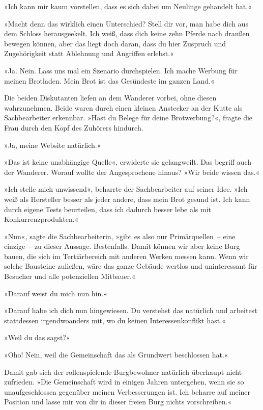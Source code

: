 »Ich kann mir kaum vorstellen, dass es sich dabei um Neulinge gehandelt hat.«

»Macht denn das wirklich einen Unterschied? Stell dir vor, man habe dich aus dem Schloss herausgeekelt. Ich weiß, dass dich keine zehn Pferde nach draußen bewegen können, aber das liegt doch daran, dass du hier Zuspruch und Zugehörigkeit statt Ablehnung und Angriffen erlebst.«

»Ja. Nein. Lass uns mal ein Szenario durchspielen. Ich mache Werbung für meinen Brotladen. Mein Brot ist das Gesündeste im ganzen Land.«

Die beiden Diskutanten liefen an dem Wanderer vorbei, ohne diesen wahrzunehmen. Beide waren durch einen kleinen Anstecker an der Kutte als Sachbearbeiter erkennbar. »Hast du Belege für deine Brotwerbung?«, fragte die Frau durch den Kopf des Zuhörers hindurch.

»Ja, meine Website natürlich.«

»Das ist keine unabhängige Quelle«, erwiderte sie gelangweilt. Das begriff auch der Wanderer. Worauf wollte der Angesprochene hinaus? »Wir beide wissen das.«

»Ich stelle mich unwissend«, beharrte der Sachbearbeiter auf seiner Idee. »Ich weiß als Hersteller besser als jeder andere, dass mein Brot gesund ist. Ich kann durch eigene Tests beurteilen, dass ich dadurch besser lebe als mit Konkurrenzprodukten.«

»Nun«, sagte die Sachbearbeiterin, »gibt es also nur Primärquellen~– eine einzige~– zu dieser Aussage. Bestenfalls. Damit können wir aber keine Burg bauen, die sich im Tertiärbereich mit anderen Werken messen kann. Wenn wir solche Bausteine zuließen, wäre das ganze Gebäude wertlos und uninteressant für Besucher und alle potenziellen Mitbauer.«

»Darauf weist du mich nun hin.«

»Darauf habe ich dich nun hingewiesen. Du verstehst das natürlich und arbeitest stattdessen irgendwoanders mit, wo du keinen Interessenkonflikt hast.«

»Weil du das sagst?«

»Oho! Nein, weil die Gemeinschaft das als Grundwert beschlossen hat.«

Damit gab sich der rollenspielende Burgbewohner natürlich überhaupt nicht zufrieden. »Die Gemeinschaft wird in einigen Jahren untergehen, wenn sie so unaufgeschlossen gegenüber meinen Verbesserungen ist. Ich beharre auf meiner Position und lasse mir von dir in dieser freien Burg nichts vorschreiben.«

